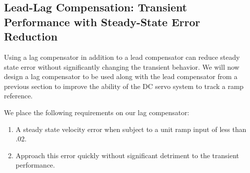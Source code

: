 \documentclass[11pt,a4paper]{article}
\begin{document}




\subsection{Lead-Lag Compensation: Transient Performance with Steady-State Error Reduction}
Using a lag compensator in addition to a lead compensator can reduce steady state error without significantly changing the transient behavior. We will now design a lag compensator to be used along with the lead compensator from a previous section to improve the ability of the DC servo system to track a ramp reference.

We place the following requirements on our lag compensator:

\begin{enumerate}
	\item A steady state velocity error when subject to a unit ramp input of less than .02.
	\item Approach this error quickly without significant detriment to the transient performance.
	
\end{enumerate}
\end{document}
